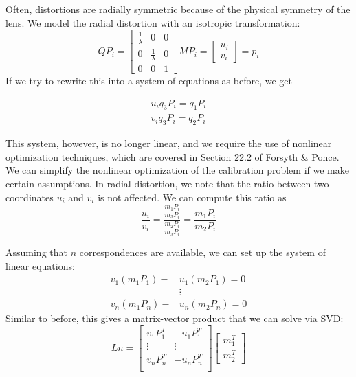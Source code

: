 \documentclass[a4paper, 12pt]{article}
\begin{document}
Often, distortions are radially symmetric because of the physical symmetry of the lens. We model the radial distortion with an isotropic transformation:
\begin{equation}
    QP_i = \begin{bmatrix}
    \frac{1}{\lambda}&0&0\\0 &    \frac{1}{\lambda} & 0 \\ 0 & 0 &1\end{bmatrix} M P_i = \begin{bmatrix}
    u_i\\v_i\end{bmatrix}
    = p_i
\end{equation}
If we try to rewrite this into a system of equations as before, we get 

\begin{align*}
    u_iq_3P_i  = q_1P_i\\
    v_iq_3P_i  = q_2P_i
\end{align*}

This system, however, is no longer linear, and we require the use of nonlinear optimization techniques, which are covered in Section 22.2 of Forsyth \& Ponce. We can simplify the nonlinear optimization of the calibration problem if we make certain assumptions. In radial distortion, we note that the ratio between two coordinates $u_i$ and $v_i$ is not affected. We can compute this ratio as
\begin{equation}
    \frac{u_i}{v_i} = \frac{\frac{m_1P_i}{m_3P_i}}{\frac{m_2P_i}{m_3P_i}} = \frac{m_1P_i}{m_2P_i}
\end{equation}

Assuming that $n$ correspondences are available, we can set up the system of linear equations:
\begin{align*}
    v_1(m_1P_1)-&u_1(m_2P_1) = 0\\
    &\vdots\\
    v_n(m_1P_n)-&u_n(m_2P_n) = 0
\end{align*}
Similar to before, this gives a matrix-vector product that we can solve via SVD:
\begin{equation}
    Ln = \begin{bmatrix}
    v_1P_1^T & -u_1P_1^T\\
    \vdots & \vdots\\
    v_nP_n^T & -u_nP_n^T\\ 
    \end{bmatrix}
    \begin{bmatrix}
    m_1^T\\m_2^T
    \end{bmatrix}
\end{equation}
\end{document}
